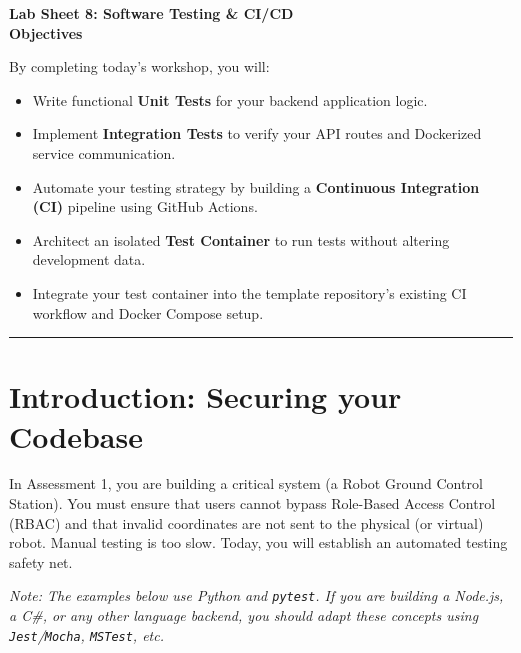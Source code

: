 \documentclass[a4paper,12pt]{article}
\begin{document}

\begin{center}
    \LARGE \textbf{Lab Sheet 8: Software Testing \& CI/CD} \\
    \vspace{0.5cm}
    \large \textbf{Objectives}
\end{center}

\noindent By completing today's workshop, you will:
\begin{itemize}
    \item Write functional \textbf{Unit Tests} for your backend application logic.
    \item Implement \textbf{Integration Tests} to verify your API routes and Dockerized service communication.
    \item Automate your testing strategy by building a \textbf{Continuous Integration (CI)} pipeline using GitHub Actions.
    \item Architect an isolated \textbf{Test Container} to run tests without altering development data.
    \item Integrate your test container into the template repository's existing CI workflow and Docker Compose setup.
\end{itemize}

\vspace{0.5cm}
\hrule
\vspace{0.5cm}

\section*{Introduction: Securing your Codebase}
In Assessment 1, you are building a critical system (a Robot Ground Control Station). You must ensure that users cannot bypass Role-Based Access Control (RBAC) and that invalid coordinates are not sent to the physical (or virtual) robot. Manual testing is too slow. Today, you will establish an automated testing safety net.

\textit{Note: The examples below use Python and \texttt{pytest}. If you are building a Node.js, a C\#, or any other language backend, you should adapt these concepts using \texttt{Jest}/\texttt{Mocha}, \texttt{MSTest}, etc.}

\end{document}
